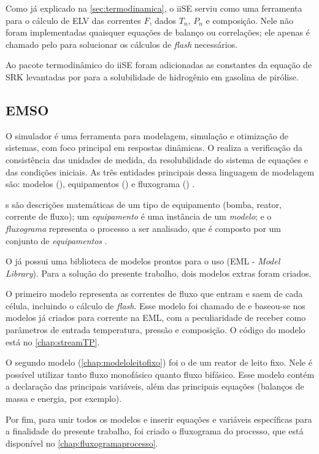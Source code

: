 Como já explicado na \autoref{sec:termodinamica}, o iiSE serviu como uma
ferramenta para o cálculo de ELV das correntes $F$, dados $T_n$, $P_n$ e
composição. Nele não foram implementadas quaisquer equações de balanço ou
correlações; ele apenas é chamado pelo \emso para solucionar os cálculos de
\emph{flash} necessários.

Ao pacote termodinâmico do iiSE foram adicionadas as constantes da equação de
SRK levantadas por  para a solubilidade de hidrogênio em
gasolina de pirólise.

\subsection{EMSO} \label{sec:EMSO}

O simulador \emso{} é uma ferramenta para modelagem, simulação e otimização de
sistemas, com foco principal em respostas dinâmicas. O \emso{} realiza a
verificação da consistência das unidades de medida, da resolubilidade do sistema
de equações e das condições iniciais. As três entidades principais dessa
linguagem de modelagem são: modelos (), equipamentos
() e fluxograma () \cite{Soares2003}.

s são descrições matemáticas de um tipo de equipamento (bomba,
reator, corrente de fluxo); um \textit{equipamento} é uma instância de um
\textit{modelo}; e o \textit{fluxograma} representa o processo a ser analisado,
que é composto por um conjunto de \textit{equipamentos} \cite{Soares2003}.

O \emso{} já possui uma biblioteca de modelos prontos para o uso (EML -
\emph{\emso{} Model Library}). Para a solução do presente trabalho, dois modelos
extras foram criados.

O primeiro modelo representa as correntes de fluxo que entram e saem de
cada célula, incluindo o cálculo de \emph{flash}. Esse modelo foi chamado de
 e baseou-se nos modelos já criados para corrente na EML, com
a peculiaridade de receber como parâmetros de entrada temperatura, pressão e
composição. O código do modelo  está no
\autoref{chap:streamTP}.

O segundo modelo (\autoref{chap:modeloleitofixo}) foi o de um reator de leito
fixo. Nele é possível utilizar tanto fluxo monofásico quanto fluxo bifásico.
Esse modelo contém a declaração das principais variáveis, além das principais
equações (balanços de massa e energia, por exemplo).

Por fim, para unir todos os modelos e inserir equações e variáveis
específicas para a finalidade do presente trabalho, foi criado o fluxograma do
processo, que está disponível no \autoref{chap:fluxogramaprocesso}.


